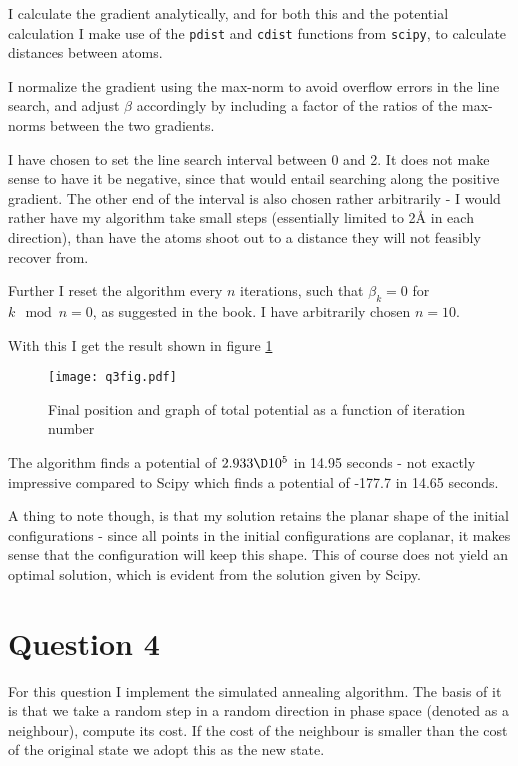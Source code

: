 \documentclass[a4paper,10pt]{article}
\begin{document}
	I calculate the gradient analytically, and for both this and the potential calculation I make use of the \texttt{pdist} and \texttt{cdist} functions from \texttt{scipy}, to calculate distances between atoms. 
	
	I normalize the gradient using the max-norm to avoid overflow errors in the line search, and adjust $ \beta $ accordingly by including a factor of the ratios of the max-norms between the two gradients.
	
	I have chosen to set the line search interval between 0 and 2. It does not make sense to have it be negative, since that would entail searching along the positive gradient. The other end of the interval is also chosen rather arbitrarily - I would rather have my algorithm take small steps (essentially limited to 2Å in each direction), than have the atoms shoot out to a distance they will not feasibly recover from.
	
	Further I reset the algorithm every $ n $ iterations, such that $ \beta_k = 0 $ for $ k \mod n  = 0  $, as suggested in the book. I have arbitrarily chosen $ n=10 $.
	
	With this I get the result shown in figure \ref{fig:q3fig}
	
	\begin{figure}[H]
		\centering
		\texttt{[image: q3fig.pdf]}
		\caption{Final position and graph of total potential as a function of iteration number}
		\label{fig:q3fig}
	\end{figure}

	The algorithm finds a potential of $ 2.933\D10^{5} $ in 14.95 seconds - not exactly impressive compared to Scipy which finds a potential of -177.7 in 14.65 seconds.
	
	A thing to note though, is that my solution retains the planar shape of the initial configurations - since all points in the initial configurations are coplanar, it makes sense that the configuration will keep this shape. This of course does not yield an optimal solution, which is evident from the solution given by Scipy.
	
	\section*{Question 4}
	For this question I implement the simulated annealing algorithm. The basis of it is that we take a random step in a random direction in phase space (denoted as a neighbour), compute its cost. If the cost of the neighbour is smaller than the cost of the original state we adopt this as the new state.
	
\end{document}
